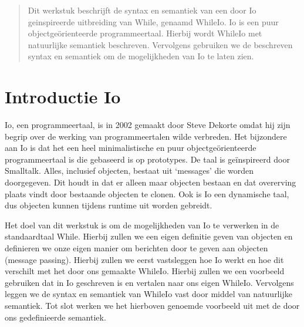 \documentclass[12pt]{article}
\begin{document}
\maketitle

\begin{abstract}
Dit werkstuk beschrijft de syntax en semantiek van een door Io geinspireerde uitbreiding van While, genaamd WhileIo. Io is een puur objectge\"orienteerde programmeertaal. Hierbij wordt WhileIo met natuurlijke semantiek beschreven. Vervolgens gebruiken we de beschreven syntax en semantiek om
de mogelijkheden van Io te laten zien.
\end{abstract}

\section{Introductie Io}
Io, een programmeertaal, is in 2002 gemaakt door Steve Dekorte omdat hij zijn begrip over de werking van programmeertalen wilde verbreden.
Het bijzondere aan Io is dat het een heel minimalistische en puur objectge\"orienteerde programmeertaal is die gebaseerd is op prototypes. De taal is ge\"inspireerd door Smalltalk. Alles, inclusief objecten, bestaat uit `messages' die worden doorgegeven.
Dit houdt in dat er alleen maar objecten bestaan en dat overerving plaats vindt door bestaande objecten te clonen.
Ook is Io een dynamische taal, dus objecten kunnen tijdens runtime uit worden gebreidt.

Het doel van dit werkstuk is om de mogelijkheden van Io te verwerken in de standaardtaal While. Hierbij zullen we een eigen definitie geven van objecten en definieren we onze eigen manier om berichten door te geven aan objecten (message passing). Hierbij zullen we eerst vastsleggen hoe Io werkt en hoe dit verschilt met het door ons gemaakte WhileIo. Hierbij zullen we een voorbeeld gebruiken dat in Io geschreven is en vertalen naar ons eigen WhileIo. Vervolgens leggen we de syntax en semantiek van WhileIo vast door middel van natuurlijke semantiek. Tot slot werken we het hierboven genoemde voorbeeld uit met de door ons gedefinieerde semantiek. 
\end{document}
